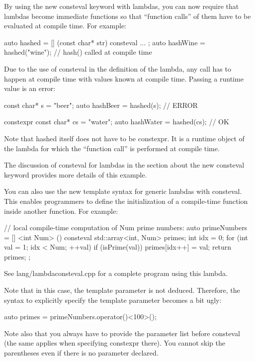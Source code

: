 By using the new consteval keyword with lambdas, you can now require that lambdas become immediate functions so that “function calls” of them have to be evaluated at compile time. For example:

\begin{cpp}
auto hashed = [] (const char* str) consteval {
					...
				};
auto hashWine = hashed("wine"); // hash() called at compile time
\end{cpp}

Due to the use of consteval in the definition of the lambda, any call has to happen at compile time with values known at compile time. Passing a runtime value is an error:

\begin{cpp}
const char* s = "beer";
auto hashBeer = hashed(s); // ERROR

constexpr const char* cs = "water";
auto hashWater = hashed(cs); // OK
\end{cpp}

Note that hashed itself does not have to be constexpr. It is a runtime object of the lambda for which the “function call” is performed at compile time.

The discussion of consteval for lambdas in the section about the new consteval keyword provides more details of this example.

You can also use the new template syntax for generic lambdas with consteval. This enables programmers to define the initialization of a compile-time function inside another function. For example:

\begin{cpp}
// local compile-time computation of Num prime numbers:
auto primeNumbers = [] <int Num> () consteval {
					std::array<int, Num> primes;
					int idx = 0;
					for (int val = 1; idx < Num; ++val) {
						if (isPrime(val)) {
							primes[idx++] = val;
						}
					}
					return primes;
				};
\end{cpp}

See lang/lambdaconsteval.cpp for a complete program using this lambda.

Note that in this case, the template parameter is not deduced. Therefore, the syntax to explicitly specify the template parameter becomes a bit ugly:

\begin{cpp}
auto primes = primeNumbers.operator()<100>();
\end{cpp}

Note also that you always have to provide the parameter list before consteval (the same applies when specifying constexpr there). You cannot skip the parentheses even if there is no parameter declared.




